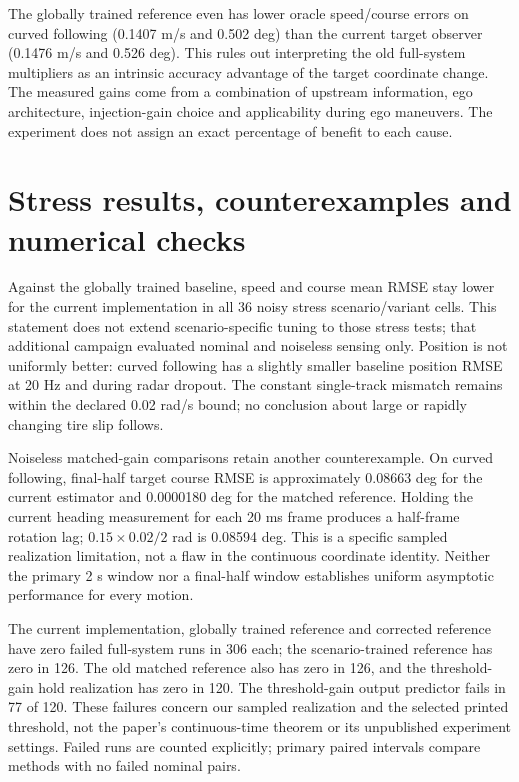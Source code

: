 \documentclass[11pt]{article}
\begin{document}
The globally trained reference even has lower oracle speed/course errors on
curved following (0.1407 m/s and 0.502 deg) than the current target observer
(0.1476 m/s and 0.526 deg). This rules out interpreting the old full-system
multipliers as an intrinsic accuracy advantage of the target coordinate
change. The measured gains come from a combination of upstream information,
ego architecture, injection-gain choice and applicability during ego maneuvers.
The experiment does not assign an exact percentage of benefit to each cause.

\section{Stress results, counterexamples and numerical checks}
Against the globally trained baseline, speed and course mean RMSE stay lower
for the current implementation in all 36 noisy stress scenario/variant cells.
This statement does not extend scenario-specific tuning to those stress tests;
that additional campaign evaluated nominal and noiseless sensing only.
Position is not uniformly better: curved following has a slightly smaller
baseline position RMSE at 20 Hz and during radar dropout.
The constant single-track mismatch remains within the declared 0.02 rad/s
bound; no conclusion about large or rapidly changing tire slip follows.

Noiseless matched-gain comparisons retain another counterexample. On curved
following, final-half target course RMSE is approximately 0.08663 deg for the
current estimator and 0.0000180 deg for the matched reference. Holding the
current heading measurement for each 20 ms frame produces a half-frame
rotation lag; $0.15\times0.02/2$ rad is 0.08594 deg. This is a specific sampled
realization limitation, not a flaw in the continuous coordinate identity.
Neither the primary 2 s window nor a final-half window establishes uniform
asymptotic performance for every motion.

The current implementation, globally trained reference and corrected reference
have zero failed full-system runs in 306 each; the scenario-trained reference
has zero in 126. The old matched reference also has zero in 126, and the
threshold-gain hold realization has zero in 120. The threshold-gain output
predictor fails in 77 of 120. These failures concern our sampled realization
and the selected printed threshold, not the paper's continuous-time theorem
or its unpublished experiment settings. Failed runs are counted explicitly;
primary paired intervals compare methods with no failed nominal pairs.
\end{document}
